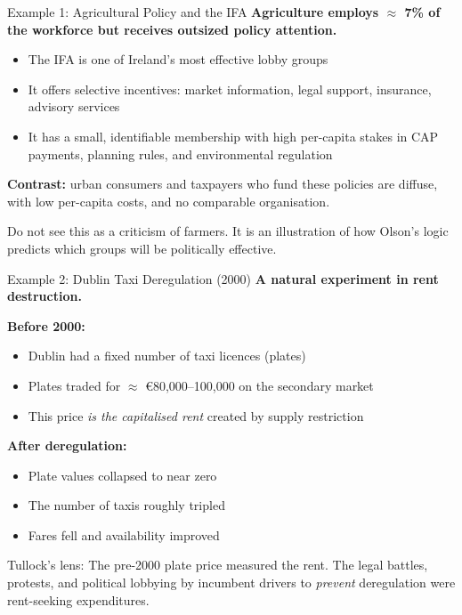 \documentclass[10pt]{beamer}
\begin{document}
\begin{frame}{Example 1: Agricultural Policy and the IFA}
\textbf{Agriculture employs $\approx$ 7\% of the workforce but receives outsized policy attention.}

\vspace{0.1cm}
\begin{itemize}
\item The IFA is one of Ireland's most effective lobby groups
\item It offers \alert{selective incentives}: market information, legal support, insurance, advisory services
\item It has a \alert{small, identifiable} membership with high per-capita stakes in CAP payments, planning rules, and environmental regulation
\end{itemize}

\vspace{0.1cm}
\textbf{Contrast:} urban consumers and taxpayers who fund these policies are diffuse, with low per-capita costs, and no comparable organisation.

\vspace{0.1cm}
\footnotesize
\alert{Do not see this as a criticism of farmers.} It is an illustration of how Olson's logic predicts which groups will be politically effective.
\end{frame}


\begin{frame}{Example 2: Dublin Taxi Deregulation (2000)}
\textbf{A natural experiment in rent destruction.}

\vspace{0.1cm}
\textbf{Before 2000:}
\begin{itemize}
\item Dublin had a fixed number of taxi licences (plates)
\item Plates traded for $\approx$ \euro 80,000--100,000 on the secondary market
\item This price \emph{is the capitalised rent} created by supply restriction
\end{itemize}

\vspace{0.1cm}
\textbf{After deregulation:}
\begin{itemize}
\item Plate values collapsed to near zero
\item The number of taxis roughly tripled
\item Fares fell and availability improved
\end{itemize}

\vspace{0.1cm}
\alert{Tullock's lens:}
The pre-2000 plate price measured the rent.
The legal battles, protests, and political lobbying by incumbent drivers to \emph{prevent} deregulation were rent-seeking expenditures.
\end{frame}
\end{document}
